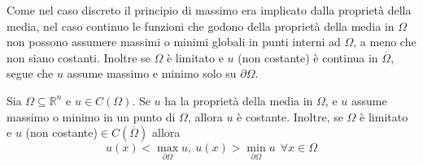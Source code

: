 \documentclass[10pt,a4paper,twoside,openright]{book}
\begin{document}
Come nel caso discreto il principio di massimo era implicato dalla proprietà della media, nel caso continuo le funzioni che godono della proprietà della media in $\displaystyle \Omega $ non possono assumere massimi o minimi globali in punti interni ad $\displaystyle \Omega $, a meno che non siano costanti. Inoltre se $\displaystyle \Omega $ è limitato e $\displaystyle u$ (non costante) è continua in $\displaystyle \overline{\Omega }$, segue che $\displaystyle u$ assume massimo e minimo solo su $\displaystyle \partial \Omega $. 
\begin{theorem}
	 Sia $\displaystyle \Omega \subseteq \mathbb{R}^{n}$ e $\displaystyle u\in C(\Omega)$. Se $\displaystyle u$ ha la proprietà della media in $\displaystyle \Omega $, e $\displaystyle u$ assume massimo o minimo in un punto di $\displaystyle \Omega $, allora $\displaystyle u$ è costante. Inoltre, se $\displaystyle \Omega $ è limitato e $\displaystyle u$ (non costante)$\displaystyle \in C(\overline{\Omega })$ allora
	\begin{equation*}
		u(x) < \max_{\partial \Omega } u,\ u(x)  >\min_{\partial \Omega } u\ \ \forall x\in \Omega 
	\end{equation*}
\end{theorem}
\end{document}
